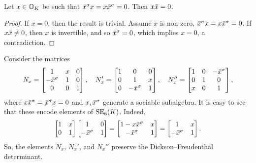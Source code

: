 \begin{lemma}
	\label{lemma:3_isotropic}
	Let $x \in \mathbb{O}_K$ be such that $\ovx^{\s} x = x \ovx^{\s} = 0$. Then $x\mathord{\mbox{\hspace*{0pt}}\,\overline{\!x\!\!\;}\!\:}\mbox{\hspace*{0pt}} = 0$.
\end{lemma}

\begin{proof}
	If $x = 0$, then the result is trivial. Assume $x$ is non-zero, $\ovx^{\s} x = x\ovx^{\s} = 0$.
	If $x \mathord{\mbox{\hspace*{0pt}}\,\overline{\!x\!\!\;}\!\:}\mbox{\hspace*{0pt}} \neq 0$, then $x$ is invertible, and so $\mathord{\mbox{\hspace*{0pt}}\,\overline{\!x\!\!\;}\!\:}\mbox{\hspace*{0pt}}^{\sigma} = 0$, which implies $x = 0$, a 
	contradiction.
\end{proof}

Consider the matrices
\begin{equation}
	N_x = \begin{bmatrix}
		1 & x & 0 \\
		-\ovx^{\s} & 1 & 0 \\
		0 & 0 & 1
	\end{bmatrix},\quad
	N_x' = \begin{bmatrix}
		1 & 0 & 0 \\
		0 & 1 & x \\
		0 & -\ovx^{\s} & 1
	\end{bmatrix},\quad
	N_x'' = \begin{bmatrix}
		1 & 0 & -\ovx^{\s} \\
		0 & 1 & 0 \\
		x & 0 & 1
	\end{bmatrix},
\end{equation}
where $x\ovx^{\s} = \ovx^{\s}x = 0$ and $x,\mathord{\mbox{\hspace*{0pt}}\,\overline{\!x\!\!\;}\!\:}\mbox{\hspace*{0pt}}^{\sigma}$ generate a sociable subalgebra. 
It is easy to see that these encode elements of $\mathrm{SE}_6(K)$. Indeed,
\begin{equation}
	\begin{bmatrix}
		1 & x \\
		0 & 1
	\end{bmatrix}
	\begin{bmatrix}
		1 & 0 \\
		-\ovx ^{\s} & 1
	\end{bmatrix} = 
	\begin{bmatrix}
		1 - x\ovx ^{\s} & x \\
		-\ovx ^{\s} & 1 
	\end{bmatrix} = 
	\begin{bmatrix}
		1 & x \\
		-\ovx ^{\s} & 1
	\end{bmatrix}.
\end{equation}
So, the elements $N_x$, $N_x'$, and $N_x''$ preserve the Dickson--Freudenthal determinant. 

